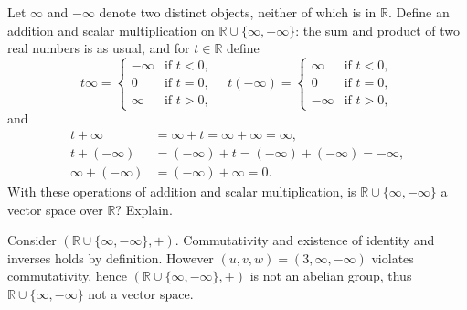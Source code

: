 \begin{exercise}
  Let $\infty$ and $-\infty$ denote two distinct objects, neither of which is in $\mathbb{R}$. Define an addition and scalar multiplication on $\mathbb{R} \cup \{\infty, -\infty\}$: the sum and product of two real numbers is as usual, and for $t \in \mathbb{R}$ define
  \[
    t \infty =
    \begin{cases}
      -\infty & \text{if } t < 0, \\
      0       & \text{if } t = 0, \\
      \infty  & \text{if } t > 0,
    \end{cases}
    \quad
    t(-\infty) =
    \begin{cases}
      \infty  & \text{if } t < 0, \\
      0       & \text{if } t = 0, \\
      -\infty & \text{if } t > 0,
    \end{cases}
  \]
  and
  \[
    \begin{aligned}
      t + \infty         & = \infty + t = \infty + \infty = \infty,           \\
      t + (-\infty)      & = (-\infty) + t = (-\infty) + (-\infty) = -\infty, \\
      \infty + (-\infty) & = (-\infty) + \infty = 0.
    \end{aligned}
  \]
  With these operations of addition and scalar multiplication, is $\mathbb{R} \cup \{\infty, -\infty\}$ a vector space over $\mathbb{R}$? Explain.
\end{exercise}

Consider $(\mathbb R\cup\{\infty,-\infty\},+)$. Commutativity and existence of identity and inverses holds by definition. However $(u,v,w)=(3,\infty,-\infty)$ violates commutativity, hence $(\mathbb R\cup\{\infty,-\infty\},+)$ is not an abelian group, thus $\mathbb{R} \cup \{\infty, -\infty\}$ not a vector space.

\setcounter{exercise}{7}

